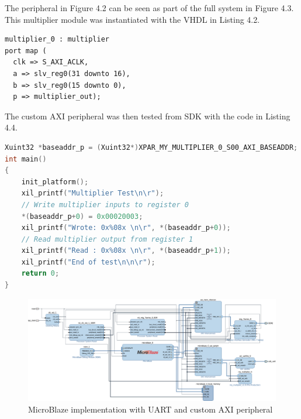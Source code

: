 \documentclass[12pt,a4paper]{report} %
\begin{document}
The peripheral in Figure 4.2 can be seen as part of the full system in Figure 4.3.
This multiplier module was instantiated with the VHDL in Listing 4.2.
\begin{lstlisting}[caption={Instantiation of custom AXI peripheral},captionpos=b,frame=single]
multiplier_0 : multiplier  
port map (  
  clk => S_AXI_ACLK,  
  a => slv_reg0(31 downto 16),  
  b => slv_reg0(15 downto 0),  
  p => multiplier_out); 
\end{lstlisting}
The custom AXI peripheral was then tested from SDK with the code in Listing 4.4.
\begin{lstlisting}[caption={C program using custom AXI},captionpos=b,language=C,frame=single]
Xuint32 *baseaddr_p = (Xuint32*)XPAR_MY_MULTIPLIER_0_S00_AXI_BASEADDR;
int main()
{
	init_platform();
	xil_printf("Multiplier Test\n\r");
	// Write multiplier inputs to register 0
	*(baseaddr_p+0) = 0x00020003;
	xil_printf("Wrote: 0x%08x \n\r", *(baseaddr_p+0));
	// Read multiplier output from register 1
	xil_printf("Read : 0x%08x \n\r", *(baseaddr_p+1));
	xil_printf("End of test\n\n\r");
	return 0;
}
\end{lstlisting}
\begin{figure}[htbp]
\centerline{\includegraphics[width=1.0\textheight,angle=90,scale=0.9]{diagrams/microblaze1}}
\caption{MicroBlaze implementation with UART and custom AXI peripheral}
\end{figure}
\newpage
\end{document}
